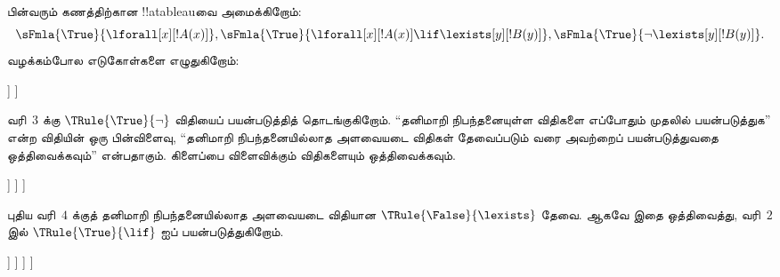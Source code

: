 \documentclass[../../../include/open-logic-section]{subfiles}
\begin{document}
\begin{ex}
பின்வரும் கணத்திற்கான !!a{tableau}வை அமைக்கிறோம்:
\[
\sFmla{\True}{\lforall[x][!A(x)]}, \sFmla{\True}{\lforall[x][!A(x)] 
  \lif \lexists[y][!B(y)]}, \sFmla{\True}{\lnot\lexists[y][!B(y)]}.
\]
வழக்கம்போல எடுகோள்களை எழுதுகிறோம்:
\begin{oltableau}
  [\sFmla{\True}{\lforall[x][\formula{A}(x)]}, just=\TAss
    [\sFmla{\True}{\lforall[x][\formula{A}(x)] \lif
        \lexists[y][\formula{B}(y)]}, just=\TAss
      [\sFmla{\True}{\lnot\lexists[y][\formula{B}(y)]}, just=\TAss
      ]
    ]
  ]
\end{oltableau}

வரி~$3$ க்கு $\TRule{\True}{\lnot}$ விதியைப் பயன்படுத்தித் தொடங்குகிறோம்.
``தனிமாறி நிபந்தனையுள்ள விதிகளை எப்போதும் முதலில் பயன்படுத்துக'' என்ற விதியின்
ஒரு பின்விளைவு, ``தனிமாறி நிபந்தனையில்லாத அளவையடை விதிகள் தேவைப்படும் வரை
அவற்றைப் பயன்படுத்துவதை ஒத்திவைக்கவும்'' என்பதாகும். கிளைப்பை விளைவிக்கும்
விதிகளையும் ஒத்திவைக்கவும்.
\begin{oltableau}
  [\sFmla{\True}{\lforall[x][\formula{A}(x)]}, just=\TAss
    [\sFmla{\True}{\lforall[x][\formula{A}(x)] \lif
        \lexists[y][\formula{B}(y)]}, just=\TAss
      [\sFmla{\True}{\lnot\lexists[y][\formula{B}(y)]}, just=\TAss, checked
        [\sFmla{\False}{\lexists[y][\formula{B}(y)]}, just={\TRule{\True}{\lnot}[3]}]
      ]
    ]
  ]
\end{oltableau}

புதிய வரி~$4$ க்குத் தனிமாறி நிபந்தனையில்லாத அளவையடை விதியான
$\TRule{\False}{\lexists}$ தேவை. ஆகவே இதை ஒத்திவைத்து, வரி~$2$ இல்
$\TRule{\True}{\lif}$ ஐப் பயன்படுத்துகிறோம்.
\begin{oltableau}
  [\sFmla{\True}{\lforall[x][\formula{A}(x)]}, just=\TAss
    [\sFmla{\True}{\lforall[x][\formula{A}(x)] \lif
        \lexists[y][\formula{B}(y)]}, just=\TAss, checked
      [\sFmla{\True}{\lnot\lexists[y][\formula{B}(y)]}, just=\TAss, checked
        [\sFmla{\False}{\lexists[y][\formula{B}(y)]},
          just={\TRule{\True}{\lnot}[3]},
          [\sFmla{\False}{\lforall[x][\formula{A}(x)]}, just={\TRule{\True}{\lif}[2]}]
          [\sFmla{\True}{\lexists[y][\formula{B}(y)]}, just={\TRule{\True}{\lif}[2]}]
        ]
      ]
    ]
  ]
\end{oltableau}


\end{ex}
\end{document}
